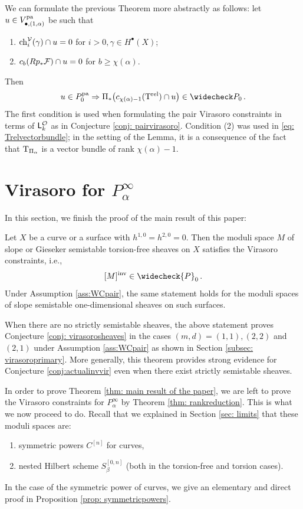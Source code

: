 \documentclass[a4paper, 12pt]{amsart}
\begin{document}
\begin{remark}\label{rem: abstractprojective}
We can formulate the previous Theorem more abstractly as follows: let $u\in V_{\bullet, (1, \alpha)}^{\mathop{\rm pa}\nolimits}$ be such that 
\begin{enumerate}
\item $\mathrm{ch}_i^{\mathcal V}(\gamma)\cap u=0$ for $i>0, \gamma\in H^\bullet(X)$;
\item $c_{b}(Rp_\ast {\mathcal F})\cap u=0$ for $b\geq \chi(\alpha)$.
\end{enumerate}
Then
\[u\in P_0^{\pa}\Rightarrow \Pi_\ast\big(c_{\chi(\alpha)-1}(\T^{\rel})\cap u\big)\in \widecheck P_0\,.\]
The first condition is used when formulating the pair Virasoro constraints in terms of ${\mathsf{L}}_k^{\mathcal O}$ as in Conjecture \ref{conj: pairvirasoro}. Condition (2) was used in \eqref{eq: Trelvectorbundle}; in the setting of the Lemma, it is a consequence of the fact that $\mathrm{T}_{\Pi_\alpha}$ is a vector bundle of rank $\chi(\alpha)-1$.
\end{remark}



\section{Virasoro for $P_\alpha^\infty$}
\label{sec:lowrank}

In this section, we finish the proof of the main result of this paper:

\begin{theorem}\label{thm: main result of the paper}
    Let $X$ be a curve or a surface with $h^{1,0}=h^{2,0}=0$. Then the moduli space $M$ of slope or Gieseker semistable torsion-free sheaves on $X$ satisfies the Virasoro constraints, i.e., 
    \[[M]^{\inva}\in \widecheck{P}_0\,.\]
    Under Assumption \ref{ass:WCpair}, the same statement holds for the moduli spaces of slope semistable one-dimensional sheaves on such surfaces.
\end{theorem}
When there are no strictly semistable sheaves, the above statement proves Conjecture \ref{conj: virasorosheaves} in the cases $(m,d) = (1,1), (2,2)$ and $(2,1)$ under Assumption \ref{ass:WCpair} as shown in Section \ref{subsec: virasoroprimary}. More generally, this theorem provides strong evidence for Conjecture \ref{conj:actualinvvir} even when there exist strictly semistable sheaves.

In order to prove Theorem \ref{thm: main result of the paper}, we are left to prove the Virasoro constraints for $P_\alpha^\infty$ by Theorem \ref{thm: rankreduction}. This is what we now proceed to do. Recall that we explained in Section \ref{sec: limits} that these moduli spaces are: 
\begin{enumerate}
    \item symmetric powers $C^{[n]}$ for curves,
    \item nested Hilbert scheme $S_\beta^{[0,n]}$ (both in the torsion-free and torsion cases).
\end{enumerate}
In the case of the symmetric power of curves, we give an elementary and direct proof in Proposition \ref{prop: symmetricpowers}.
\end{document}

